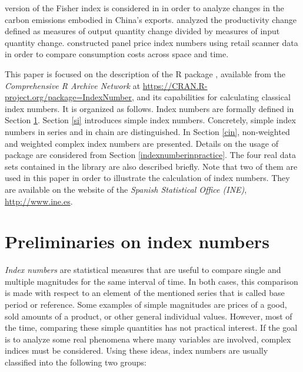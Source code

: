 version of the Fisher index is considered in \cite{su2014attribution} in order to analyze changes in the carbon emissions embodied in China's exports. \cite{o2018measures} analyzed the productivity change defined as measures of output quantity change divided by measures of input quantity change.  \cite{zhen2019scanner} constructed panel price index numbers using retail scanner data in order to compare consumption costs across space and time.

This paper is focused on the description of the R package  \citep{SN}, available from the \emph{Comprehensive R Archive
Network} at \url{https://CRAN.R-project.org/package=IndexNumber}, and its capabilities for calculating classical index numbers. It is organized as follows. Index numbers are formally defined in Section \ref{sec1}. Section \ref{si} introduces simple index numbers. Concretely, simple index numbers in series and in chain are distinguished. In Section \ref{cin}, non-weighted and weighted complex index numbers are presented. Details on the usage of  package are considered from Section \ref{indexnumberinpractice}. The four real data sets contained in the library are also described briefly. Note that two of them are used in this paper in order to illustrate the calculation of index numbers. They are available on the website of the \emph{Spanish Statistical Office (INE)}, \url{http://www.ine.es}.



\vspace{-0.3 cm}
\section{Preliminaries on index numbers}\label{sec1}

\emph{Index numbers} are statistical measures that are useful to compare single and multiple magnitudes for the same interval of time. In both cases, this comparison is made with respect to an element of the mentioned series that is called base period or reference. 
Some examples of simple magnitudes are prices of a good, sold amounts of a product,  or other general individual values.  However, most of the time,  comparing these simple quantities has not practical interest. If the goal is to analyze some real phenomena where many variables are involved, complex indices must be considered. Using these ideas,  index numbers are usually classified into the following two groups:\vspace{-0.15 cm}

